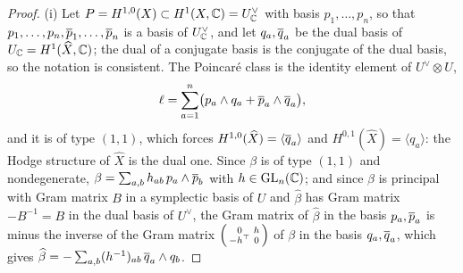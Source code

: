 \begin{proof}
(i) Let $P=H^{1,0}(X)\subset H^{1}(X,\mathbb{C})=U^{\vee}_{\mathbb{C}}$ with basis
$p_{1},\dots,p_{n}$, so that $p_{1},\dots,p_{n},\overline{p}_{1},\dots,\overline{p}_{n}$
is a basis of $U^{\vee}_{\mathbb{C}}$, and let $q_{a},\overline{q}_{a}$ be the dual basis
of $U_{\mathbb{C}}=H^{1}(\widehat X,\mathbb{C})$; the dual of a conjugate basis is the
conjugate of the dual basis, so the notation is consistent. The Poincar\'e
class is the identity element of $U^{\vee}\otimes U$,
\[
  \ell=\sum_{a=1}^{n}\bigl(p_{a}\wedge q_{a}+\overline{p}_{a}\wedge\overline{q}_{a}\bigr),
\]
and it is of type $(1,1)$, which forces $H^{1,0}(\widehat X)=\langle\overline{q}_{a}\rangle$ and $H^{0,1}(\widehat X)=\langle q_{a}\rangle$: the Hodge
structure of $\widehat X$ is the dual one. Since $\beta$ is of type $(1,1)$
and nondegenerate, $\beta=\sum_{a,b}h_{ab}\,p_{a}\wedge\overline{p}_{b}$ with
$h\in\operatorname{GL}_{n}(\mathbb{C})$; and since $\beta$ is principal with Gram matrix $B$ in a
symplectic basis of $U$ and $\widehat\beta$ has Gram matrix $-B^{-1}=B$ in
the dual basis of $U^{\vee}$, the Gram matrix of $\widehat\beta$ in the
basis $p_{a},\overline{p}_{a}$ is minus the inverse of the Gram matrix
$\begin{psmallmatrix}0&h\\-h^{\top}&0\end{psmallmatrix}$ of $\beta$ in the
basis $q_{a},\overline{q}_{a}$, which gives
$\widehat\beta=-\sum_{a,b}(h^{-1})_{ab}\,\overline{q}_{a}\wedge q_{b}$.


\end{proof}
